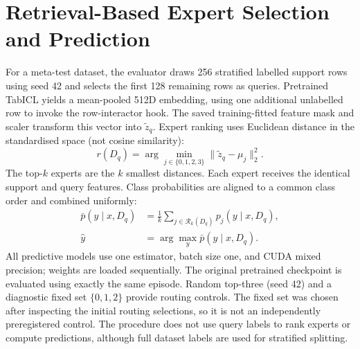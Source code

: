 \documentclass[conference]{IEEEtran}
\begin{document}
\section{Retrieval-Based Expert Selection and Prediction}
For a meta-test dataset, the evaluator draws 256 stratified labelled support rows using seed 42 and selects the first 128 remaining rows as queries. Pretrained TabICL yields a mean-pooled 512D embedding, using one additional unlabelled row to invoke the row-interactor hook. The saved training-fitted feature mask and scaler transform this vector into $\widetilde z_q$. Expert ranking uses Euclidean distance in the standardised space (not cosine similarity):
\begin{equation}
r(D_q)=\arg\min_{j\in\{0,1,2,3\}}\|\widetilde z_q-\mu_j\|_2^2.
\end{equation}
The top-$k$ experts are the $k$ smallest distances. Each expert receives the identical support and query features. Class probabilities are aligned to a common class order and combined uniformly:
\begin{equation}
\begin{aligned}
\bar p(y\mid x,D_q)&=\frac1k\sum_{j\in\mathcal R_k(D_q)}p_j(y\mid x,D_q),\\
\widehat y&=\arg\max_y\bar p(y\mid x,D_q).
\end{aligned}
\end{equation}
All predictive models use one estimator, batch size one, and CUDA mixed precision; weights are loaded sequentially. The original pretrained checkpoint is evaluated using exactly the same episode. Random top-three (seed 42) and a diagnostic fixed set $\{0,1,2\}$ provide routing controls. The fixed set was chosen after inspecting the initial routing selections, so it is not an independently preregistered control. The procedure does not use query labels to rank experts or compute predictions, although full dataset labels are used for stratified splitting.
\end{document}
